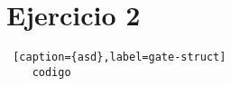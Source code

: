 \section{Ejercicio 2}


\begin{lstlisting} [caption={asd},label=gate-struct]
    codigo
\end{lstlisting}

